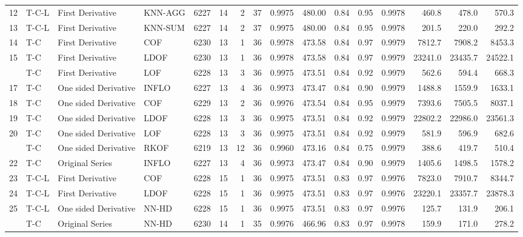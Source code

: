 \documentclass[draft]{agujournal2018} %
\begin{document}
\begin{table}[!htbp]
{\begin{tabular}{rlllrrrrrrrrrrrr}
12 & T-C-L & First Derivative & KNN-AGG & 6227 & 14 & 2 & 37 & 0.9975 & 480.00 & 0.84 & 0.95 & 0.9978 & 460.8 & 478.0 & 570.3\\
13 & T-C-L & First Derivative & KNN-SUM & 6227 & 14 & 2 & 37 & 0.9975 & 480.00 & 0.84 & 0.95 & 0.9978 & 201.5 & 220.0 & 292.2\\
14 & T-C & First Derivative & COF & 6230 & 13 & 1 & 36 & 0.9978 & 473.58 & 0.84 & 0.97 & 0.9979 & 7812.7 & 7908.2 & 8453.3\\
15 & T-C & First Derivative & LDOF & 6230 & 13 & 1 & 36 & 0.9978 & 473.58 & 0.84 & 0.97 & 0.9979 & 23241.0 & 23435.7 & 24522.1\\
\addlinespace
16 & T-C & First Derivative & LOF & 6228 & 13 & 3 & 36 & 0.9975 & 473.51 & 0.84 & 0.92 & 0.9979 & 562.6 & 594.4 & 668.3\\
17 & T-C & One sided Derivative & INFLO & 6227 & 13 & 4 & 36 & 0.9973 & 473.47 & 0.84 & 0.90 & 0.9979 & 1488.8 & 1559.9 & 1633.1\\
18 & T-C & One sided Derivative & COF & 6229 & 13 & 2 & 36 & 0.9976 & 473.54 & 0.84 & 0.95 & 0.9979 & 7393.6 & 7505.5 & 8037.1\\
19 & T-C & One sided Derivative & LDOF & 6228 & 13 & 3 & 36 & 0.9975 & 473.51 & 0.84 & 0.92 & 0.9979 & 22802.2 & 22986.0 & 23561.3\\
20 & T-C & One sided Derivative & LOF & 6228 & 13 & 3 & 36 & 0.9975 & 473.51 & 0.84 & 0.92 & 0.9979 & 581.9 & 596.9 & 682.6\\
\addlinespace
21 & T-C & One sided Derivative & RKOF & 6219 & 13 & 12 & 36 & 0.9960 & 473.16 & 0.84 & 0.75 & 0.9979 & 388.6 & 419.7 & 510.4\\
22 & T-C & Original Series & INFLO & 6227 & 13 & 4 & 36 & 0.9973 & 473.47 & 0.84 & 0.90 & 0.9979 & 1405.6 & 1498.5 & 1578.2\\
23 & T-C-L & First Derivative & COF & 6228 & 15 & 1 & 36 & 0.9975 & 473.51 & 0.83 & 0.97 & 0.9976 & 7823.0 & 7910.7 & 8344.7\\
24 & T-C-L & First Derivative & LDOF & 6228 & 15 & 1 & 36 & 0.9975 & 473.51 & 0.83 & 0.97 & 0.9976 & 23220.1 & 23357.7 & 23878.3\\
25 & T-C-L & One sided Derivative & \color{black} NN-HD \color{black}  & 6228 & 15 & 1 & 36 & 0.9975 & 473.51 & 0.83 & 0.97 & 0.9976 & 125.7 & 131.9 & 206.1\\
\addlinespace
26 & T-C & Original Series & \color{black} NN-HD \color{black}  & 6230 & 14 & 1 & 35 & 0.9976 & 466.96 & 0.83 & 0.97 & 0.9978 & 159.9 & 171.0 & 278.2\\

\end{tabular}}
\end{table}
\end{document}

